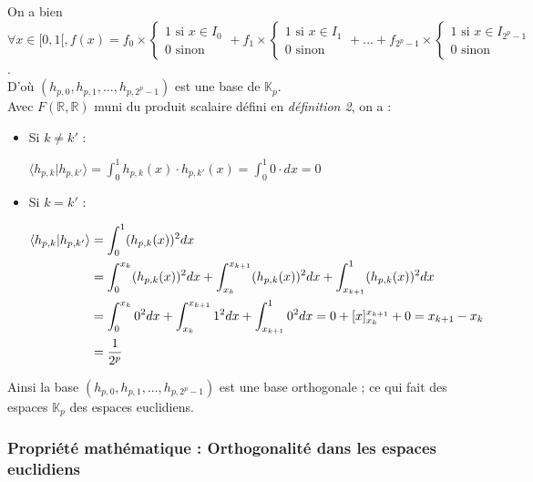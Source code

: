 \documentclass{article}
\begin{document}
On a bien $\forall x \in [0,1[, f(x) = f_0 \times \begin{cases} 1 \text{ si } x \in I_0 \\ 0 \text{ sinon } \end{cases}
+ f_1 \times \begin{cases} 1 \text{ si } x \in I_1 \\ 0 \text{ sinon } \end{cases}
+ ... +
f_{2^p - 1} \times \begin{cases} 1 \text{ si } x \in I_{2^p - 1} \\ 0 \text{ sinon } \end{cases} $.\\

D'où $(h_{p,0},h_{p,1},...,h_{p,2^p -1})$ est une base de $\mathbb{K}_p$.\\


Avec $F(\mathbb{R},\mathbb{R})$ muni du produit scalaire défini en \textit{définition 2}, on a : \\

\begin{itemize}

\item Si $k \neq k'$ :

$\displaystyle \langle h_{p,k}|h_{p,k'} \rangle = \int_{0}^{1} h_{p,k}(x)\cdot{}h_{p,k'}(x) = \int_0^1 0\cdot{}dx = 0$ \\

\item Si $k = k'$ :

\begin{align*} \displaystyle
\langle h_{p,k}|h_{p,k'} \rangle &= \int_{0}^{1} (h_{p,k}(x))^2 dx \\
 &= \int_{0}^{x_k} (h_{p,k}(x))^2 dx + \int_{x_k}^{x_{k+1}} (h_{p,k}(x))^2 dx + \int_{x_{k+1}}^{1} (h_{p,k}(x))^2 dx  \\
\displaystyle &= \int_0^{x_k} 0^2 dx + \int_{x_k}^{x_{k+1}} 1^2 dx + \int_{x_{k+1}}^{1} 0^2 dx = 0 + [x]_{x_k}^{x_{k+1}} + 0 = x_{k+1} - x_k  \\
\displaystyle &= \frac{1}{2^p} \\
\end{align*} 
\end{itemize}

Ainsi la base $(h_{p,0},h_{p,1},...,h_{p,2^p -1})$ est une base orthogonale ; ce qui fait des espaces $\mathbb{K}_p$ des espaces euclidiens.


\subsubsection{Propriété mathématique : Orthogonalité dans les espaces euclidiens}
\end{document}

